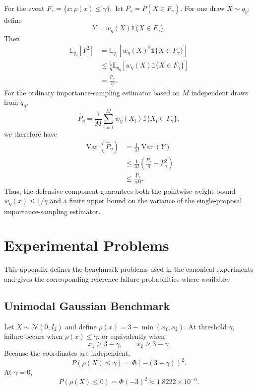 For the event
\(
    F_\gamma
    =
    \{x:\rho(x)\leq\gamma\},
\)
let
\(
    P_\gamma
    =
    P(X\in F_\gamma).
\)
For one draw $X\sim q_\eta$, define
\[
    Y
    =
    w_\eta(X)
    \mathds{1}\{X\in F_\gamma\}.
\]
Then
\[
\begin{aligned}
    \mathbb E_{q_\eta}[Y^2]
    &=
    \mathbb E_{q_\eta}
    \left[
        w_\eta(X)^2
        \mathds{1}\{X\in F_\gamma\}
    \right] \\
    &\leq
    \frac{1}{\eta}
    \mathbb E_{q_\eta}
    \left[
        w_\eta(X)
        \mathds{1}\{X\in F_\gamma\}
    \right] \\
    &=
    \frac{P_\gamma}{\eta}.
\end{aligned}
\]
For the ordinary importance-sampling estimator based on $M$ independent draws from $q_\eta$,
\[
    \widehat P_\eta
    =
    \frac{1}{M}
    \sum_{i=1}^{M}
    w_\eta(X_i)
    \mathds{1}\{X_i\in F_\gamma\},
\]
we therefore have
\[
\begin{aligned}
    \operatorname{Var}(\widehat P_\eta)
    &=
    \frac{1}{M}
    \operatorname{Var}(Y) \\
    &\leq
    \frac{1}{M}
    \left(
        \frac{P_\gamma}{\eta}
        -
        P_\gamma^2
    \right) \\
    &\leq
    \frac{P_\gamma}{\eta M}.
\end{aligned}
\]
Thus, the defensive component guarantees both the pointwise weight bound $w_\eta(x)\leq1/\eta$ and a finite upper bound on the variance of the single-proposal importance-sampling estimator.

\section{Experimental Problems}
\label{app:problems}

This appendix defines the benchmark problems used in the canonical experiments and gives the corresponding reference failure probabilities where available.

\subsection{Unimodal Gaussian Benchmark}
\label{app:unimodal}

Let $X\sim\mathcal N(0,I_2)$ and define
\(
    \rho(x)
    =
    3-\min(x_1,x_2).
\)
At threshold $\gamma$, failure occurs when $\rho(x)\leq\gamma$, or equivalently when
\[
    x_1\geq3-\gamma,
    \qquad
    x_2\geq3-\gamma.
\]
Because the coordinates are independent, 
\[
    P(\rho(X)\leq\gamma) = \Phi\!\left(-(3-\gamma)\right)^2.
\]
At $\gamma=0$,
\[
    P(\rho(X)\leq0)
    =
    \Phi(-3)^2
    \approx
    1.8222\times10^{-6}.
\]

